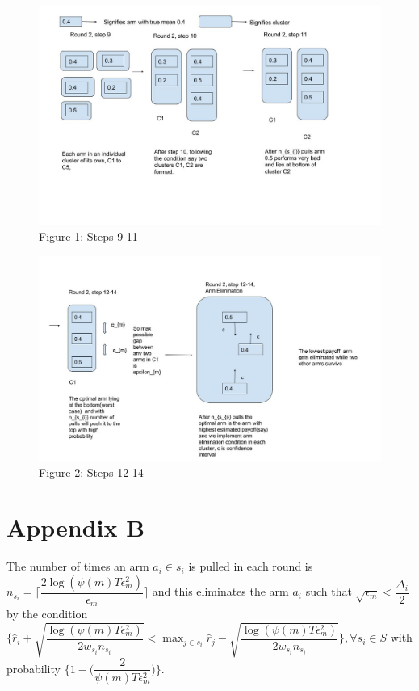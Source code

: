 \begin{figure}[!tbp]
\centering
\includegraphics[scale=0.4]{img/diag1.jpg}
\caption{Figure 1: Steps 9-11}
\end{figure}
\begin{figure}[!tbp]
\includegraphics[scale=0.4]{img/diag2.jpg}
\caption{Figure 2: Steps 12-14}
\end{figure}



\section*{Appendix B}

\begin{proposition}
The number of times an arm $a_{i}\in s_{i}$ is pulled in each round is $n_{s_{i}}=\bigg\lceil\dfrac{2\log{(\psi(m)T\epsilon_{m}^{2})}}{\epsilon_{m}}\bigg\rceil$ and this eliminates the arm $a_{i}$ such that $\sqrt{\epsilon_{m}}<\dfrac{\Delta_{i}}{2}$ by the condition $\bigg\lbrace\hat{r}_{i} + \sqrt{\dfrac{\log (\psi(m)T\epsilon_{m}^{2})}{2w_{s_{i}} n_{s_{i}}}} < \max_{j\in s_{i}}\hat{r}_{j} - \sqrt{\dfrac{\log (\psi(m)T\epsilon_{m}^{2})}{2w_{s_{i}} n_{s_{i}}}} \bigg\rbrace, \forall s_{i}\in S$ with probability $\bigg\lbrace 1-\bigg(\dfrac{2}{\psi(m)T\epsilon_{m}^{2}}\bigg)\bigg\rbrace$. 
\end{proposition}

